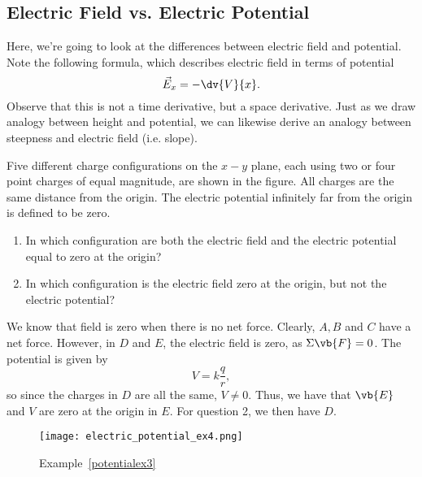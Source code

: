 \documentclass[11pt]{article}
\begin{document}
\subsection{Electric Field vs. Electric Potential}
Here, we're going to look at the differences between electric field and potential. Note the following formula, which describes electric field in terms of potential
\[\vec{E}_x = -\dv{V}{x}.\]
Observe that this is not a time derivative, but a space derivative. Just as we draw analogy between height and potential, we can likewise derive an analogy between steepness and electric field (i.e. slope).
\begin{example}\label{potentialex3}
    Five different charge configurations on the $x-y$ plane, each using two or four point charges of equal magnitude, are shown in the figure. All charges are the same distance from the origin. The electric potential infinitely far from the origin is defined to be zero.
    \begin{enumerate}
        \item In which configuration are both the electric field and the electric potential equal to zero at the origin?
        \item In which configuration is the electric field zero at the origin, but not the electric potential?
    \end{enumerate}
\end{example}
\begin{solution}
    We know that field is zero when there is no net force. Clearly, $A, B$ and $C$ have a net force. However, in $D$ and $E$, the electric field is zero, as $\Sigma \vb{F} = 0$. The potential is given by
    \[V = k\frac{q}{r},\]
    so since the charges in $D$ are all the same, $V \neq 0$. Thus, we have that $\vb{E}$ and $V$ are zero at the origin in $\boxed{E}$. For question 2, we then have $\boxed{D}$.
\end{solution}
\begin{figure}
    \centering
    \texttt{[image: electric\_potential\_ex4.png]}
    \caption{Example~\ref{potentialex3}}
\end{figure}
\end{document}
